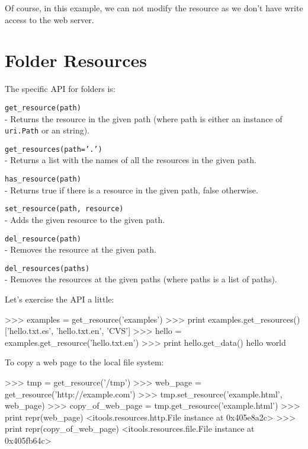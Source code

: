 Of course, in this example, we can not modify the resource as we don't have
write access to the web server.


\section{Folder Resources}

The specific API for folders is:

\begin{api}
  {\tt get\_resource(path)}\\
  - Returns the resource in the given path (where path is either an instance
    of {\tt uri.Path} or an string).

  {\tt get\_resources(path='.')}\\
  - Returns a list with the names of all the resources in the given path.

  {\tt has\_resource(path)}\\
  - Returns true if there is a resource in the given path, false otherwise.

  {\tt set\_resource(path, resource)}\\
  - Adds the given resource to the given path.

  {\tt del\_resource(path)}\\
  - Removes the resource at the given path.

  {\tt del\_resources(paths)}\\
  - Removes the resources at the given paths (where paths is a list of paths).
\end{api}

Let's exercise the API a little:

\begin{code}
    >>> examples = get_resource('examples')
    >>> print examples.get_resources()
    ['hello.txt.es', 'hello.txt.en', 'CVS']
    >>> hello = examples.get_resource('hello.txt.en')
    >>> print hello.get_data()
    hello world
\end{code}

To copy a web page to the local file system:

\begin{code}
    >>> tmp = get_resource('/tmp')
    >>> web_page = get_resource('http://example.com')
    >>> tmp.set_resource('example.html', web_page)
    >>> copy_of_web_page = tmp.get_resource('example.html')
    >>> print repr(web_page)
    <itools.resources.http.File instance at 0x405e8a2c>
    >>> print repr(copy_of_web_page)
    <itools.resources.file.File instance at 0x405fb64c>
\end{code}

